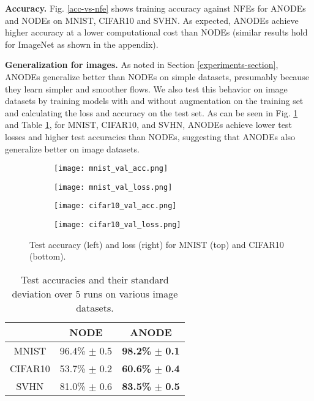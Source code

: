 \documentclass{article}
\begin{document}
\textbf{Accuracy.} Fig. \ref{acc-vs-nfe} shows training accuracy against NFEs for ANODEs and NODEs on MNIST, CIFAR10 and SVHN. As expected, ANODEs achieve higher accuracy at a lower computational cost than NODEs (similar results hold for ImageNet as shown in the appendix).

\textbf{Generalization for images.} As noted in Section \ref{experiments-section}, ANODEs generalize better than NODEs on simple datasets, presumably because they learn simpler and smoother flows. We also test this behavior on image datasets by training models with and without augmentation on the training set and calculating the loss and accuracy on the test set. As can be seen in Fig. \ref{img-generalization} and Table \ref{acc-table}, for MNIST, CIFAR10, and SVHN, ANODEs achieve lower test losses and higher test accuracies than NODEs, suggesting that ANODEs also generalize better on image datasets. 

\begin{figure}[t]
\vspace{-5pt}
\centering
\begin{subfigure}[t]{0.34\linewidth}
\centering
\texttt{[image: mnist\_val\_acc.png]}
\end{subfigure}
\begin{subfigure}[t]{0.34\linewidth}
\centering
\texttt{[image: mnist\_val\_loss.png]}
\end{subfigure}
\begin{subfigure}[t]{0.34\linewidth}
\centering
\texttt{[image: cifar10\_val\_acc.png]}
\end{subfigure}
\begin{subfigure}[t]{0.34\linewidth}
\centering
\texttt{[image: cifar10\_val\_loss.png]}
\end{subfigure}
\setlength{\abovecaptionskip}{-1pt}
\caption{Test accuracy (left) and loss (right) for MNIST (top) and CIFAR10 (bottom).}
\label{img-generalization}
\end{figure}

\begin{table}[h]
\vspace{-5pt}
\begin{center}
\begin{tabular}{c c c}
 & NODE & ANODE
\\ \hline
MNIST & 96.4\% $\pm$ 0.5 & \textbf{98.2\%} $\mathbf{\pm}$ \textbf{0.1} \\
CIFAR10 & 53.7\% $\pm$ 0.2 & \textbf{60.6\%} $\mathbf{\pm}$ \textbf{0.4} \\
SVHN & 81.0\% $\pm$ 0.6 & \textbf{83.5\%} $\mathbf{\pm}$ \textbf{0.5} \\
\end{tabular}
\end{center}
\setlength{\abovecaptionskip}{-0pt}
\setlength{\belowcaptionskip}{-12pt}
\caption{Test accuracies and their standard deviation over 5 runs on various image datasets.}
\label{acc-table}
\end{table}
\end{document}
